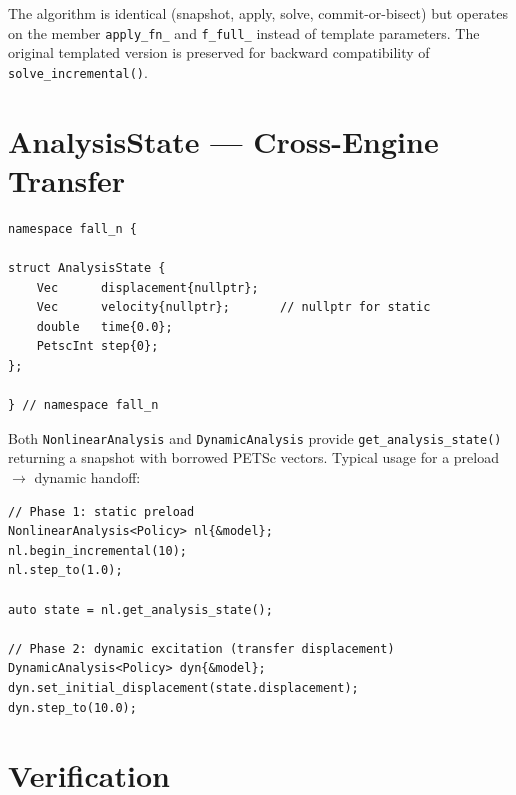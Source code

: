 The algorithm is identical (snapshot, apply, solve, commit-or-bisect) but
operates on the member \texttt{apply\_fn\_} and \texttt{f\_full\_} instead
of template parameters.  The original templated version is preserved for
backward compatibility of \texttt{solve\_incremental()}.


\section{AnalysisState — Cross-Engine Transfer}

\begin{verbatim}
namespace fall_n {

struct AnalysisState {
    Vec      displacement{nullptr};
    Vec      velocity{nullptr};       // nullptr for static
    double   time{0.0};
    PetscInt step{0};
};

} // namespace fall_n
\end{verbatim}

Both \texttt{NonlinearAnalysis} and \texttt{DynamicAnalysis} provide
\texttt{get\_analysis\_state()} returning a snapshot with borrowed PETSc
vectors.  Typical usage for a preload $\to$ dynamic handoff:

\begin{verbatim}
// Phase 1: static preload
NonlinearAnalysis<Policy> nl{&model};
nl.begin_incremental(10);
nl.step_to(1.0);

auto state = nl.get_analysis_state();

// Phase 2: dynamic excitation (transfer displacement)
DynamicAnalysis<Policy> dyn{&model};
dyn.set_initial_displacement(state.displacement);
dyn.step_to(10.0);
\end{verbatim}


\section{Verification}

